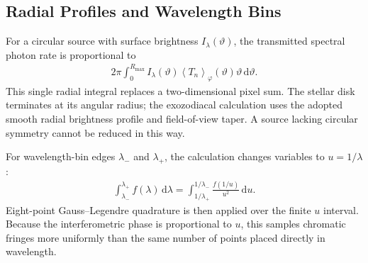 \documentclass[12pt,a4paper]{article}
\numberwithin{equation}{section}
\numberwithin{figure}{section}
\numberwithin{table}{section}
\begin{document}
\subsection{Radial Profiles and Wavelength Bins}
For a circular source with surface brightness $I_\lambda(\vartheta)$, the transmitted spectral photon rate is proportional to
\begin{align}
2\pi\int_0^{R_\mathrm{max}}
I_\lambda(\vartheta)
\left\langle T_n\right\rangle_\varphi(\vartheta)
\vartheta\,\mathrm{d}\vartheta.
\end{align}
This single radial integral replaces a two-dimensional pixel sum. The stellar disk terminates at its angular radius; the exozodiacal calculation uses the adopted smooth radial brightness profile and field-of-view taper. A source lacking circular symmetry cannot be reduced in this way.

For wavelength-bin edges $\lambda_-$ and $\lambda_+$, the calculation changes variables to $u=1/\lambda$:
\begin{align}
\int_{\lambda_-}^{\lambda_+}f(\lambda)\,\mathrm{d}\lambda
=\int_{1/\lambda_+}^{1/\lambda_-}
\frac{f(1/u)}{u^2}\,\mathrm{d}u.
\end{align}
Eight-point Gauss--Legendre quadrature is then applied over the finite $u$ interval. Because the interferometric phase is proportional to $u$, this samples chromatic fringes more uniformly than the same number of points placed directly in wavelength.
\end{document}
